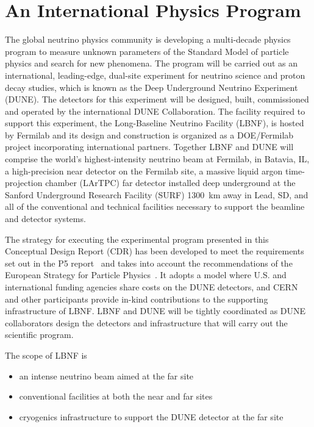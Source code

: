 
\section{An International Physics Program}

The global neutrino physics community is developing a multi-decade
physics program to measure unknown parameters of the Standard Model of
particle physics and search for new phenomena.  The program will be carried out as an international,
leading-edge, dual-site experiment for neutrino science and proton decay studies, which 
is known as the Deep Underground Neutrino Experiment (DUNE).
The detectors for this experiment will be designed, built, commissioned and operated by the international DUNE Collaboration. The facility required to support this experiment, the Long-Baseline Neutrino Facility (LBNF), is hosted by Fermilab and its design and construction is organized as a DOE/Fermilab project incorporating international partners. Together LBNF and DUNE will comprise the world's highest-intensity neutrino beam at Fermilab, in Batavia, IL, a high-precision near detector on the Fermilab site, a massive liquid argon time-projection chamber (LArTPC) far detector installed deep underground at the Sanford Underground Research Facility (SURF) \SI{1300}{\km} away in Lead, SD, and all of the conventional and technical facilities necessary to support the beamline and detector systems. 


The strategy for executing the experimental program presented in this Conceptual 
Design Report (CDR) has been developed to meet the requirements 
set out in the P5 report~\cite{p5report} and takes into account the recommendations of the European Strategy for Particle Physics~\cite{ESPP-2012}. It adopts a model where U.S. and international funding agencies 
share costs on the DUNE detectors, and CERN and other participants provide in-kind contributions 
to the supporting infrastructure of LBNF. LBNF and DUNE will be tightly coordinated as DUNE collaborators 
design the detectors and infrastructure that will carry out the scientific program.
  
The scope of LBNF is
\begin{itemize}
\item an intense neutrino beam aimed at the far site
\item conventional facilities at both the near and far sites
\item cryogenics infrastructure to support the DUNE detector at the far site
\end{itemize}

